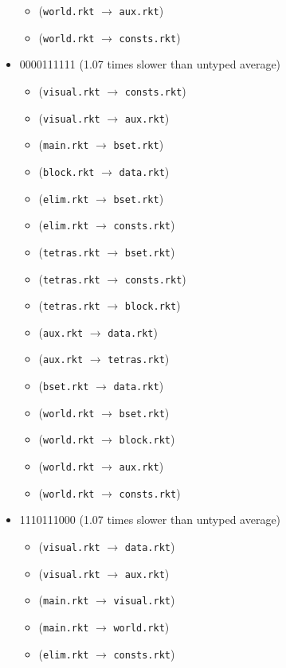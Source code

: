 \documentclass{article}
\newcommand{\mono}[1]{\texttt{#1}}
\begin{document}
\begin{itemize}
\begin{itemize}
  \item (\mono{world.rkt} $\rightarrow$ \mono{aux.rkt})
  \item (\mono{world.rkt} $\rightarrow$ \mono{consts.rkt})
  \end{itemize}
\item 0000111111 (1.07 times slower than untyped average)
  \begin{itemize}
  \item (\mono{visual.rkt} $\rightarrow$ \mono{consts.rkt})
  \item (\mono{visual.rkt} $\rightarrow$ \mono{aux.rkt})
  \item (\mono{main.rkt} $\rightarrow$ \mono{bset.rkt})
  \item (\mono{block.rkt} $\rightarrow$ \mono{data.rkt})
  \item (\mono{elim.rkt} $\rightarrow$ \mono{bset.rkt})
  \item (\mono{elim.rkt} $\rightarrow$ \mono{consts.rkt})
  \item (\mono{tetras.rkt} $\rightarrow$ \mono{bset.rkt})
  \item (\mono{tetras.rkt} $\rightarrow$ \mono{consts.rkt})
  \item (\mono{tetras.rkt} $\rightarrow$ \mono{block.rkt})
  \item (\mono{aux.rkt} $\rightarrow$ \mono{data.rkt})
  \item (\mono{aux.rkt} $\rightarrow$ \mono{tetras.rkt})
  \item (\mono{bset.rkt} $\rightarrow$ \mono{data.rkt})
  \item (\mono{world.rkt} $\rightarrow$ \mono{bset.rkt})
  \item (\mono{world.rkt} $\rightarrow$ \mono{block.rkt})
  \item (\mono{world.rkt} $\rightarrow$ \mono{aux.rkt})
  \item (\mono{world.rkt} $\rightarrow$ \mono{consts.rkt})
  \end{itemize}
\item 1110111000 (1.07 times slower than untyped average)
  \begin{itemize}
  \item (\mono{visual.rkt} $\rightarrow$ \mono{data.rkt})
  \item (\mono{visual.rkt} $\rightarrow$ \mono{aux.rkt})
  \item (\mono{main.rkt} $\rightarrow$ \mono{visual.rkt})
  \item (\mono{main.rkt} $\rightarrow$ \mono{world.rkt})
  \item (\mono{elim.rkt} $\rightarrow$ \mono{consts.rkt})

\end{itemize}
\end{itemize}
\end{document}
